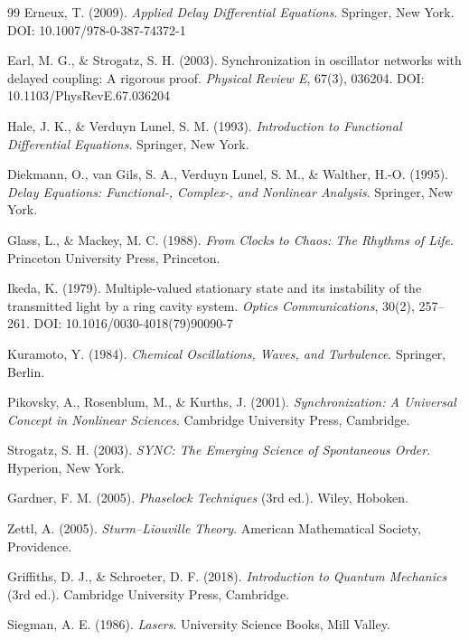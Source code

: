 \documentclass[11pt]{article}
\begin{document}
    
    \begin{thebibliography}{99}
         Erneux, T. (2009). \textit{Applied Delay Differential Equations}. Springer, New York. DOI: 10.1007/978-0-387-74372-1

         Earl, M. G., \& Strogatz, S. H. (2003). Synchronization in oscillator networks with delayed coupling: A rigorous proof. \textit{Physical Review E}, 67(3), 036204. DOI: 10.1103/PhysRevE.67.036204

         Hale, J. K., \& Verduyn Lunel, S. M. (1993). \textit{Introduction to Functional Differential Equations}. Springer, New York.

         Diekmann, O., van Gils, S. A., Verduyn Lunel, S. M., \& Walther, H.-O. (1995). \textit{Delay Equations: Functional-, Complex-, and Nonlinear Analysis}. Springer, New York.

         Glass, L., \& Mackey, M. C. (1988). \textit{From Clocks to Chaos: The Rhythms of Life}. Princeton University Press, Princeton.

         Ikeda, K. (1979). Multiple-valued stationary state and its instability of the transmitted light by a ring cavity system. \textit{Optics Communications}, 30(2), 257--261. DOI: 10.1016/0030-4018(79)90090-7

         Kuramoto, Y. (1984). \textit{Chemical Oscillations, Waves, and Turbulence}. Springer, Berlin.

         Pikovsky, A., Rosenblum, M., \& Kurths, J. (2001). \textit{Synchronization: A Universal Concept in Nonlinear Sciences}. Cambridge University Press, Cambridge.

         Strogatz, S. H. (2003). \textit{SYNC: The Emerging Science of Spontaneous Order}. Hyperion, New York.

         Gardner, F. M. (2005). \textit{Phaselock Techniques} (3rd ed.). Wiley, Hoboken.

         Zettl, A. (2005). \textit{Sturm--Liouville Theory}. American Mathematical Society, Providence.

         Griffiths, D. J., \& Schroeter, D. F. (2018). \textit{Introduction to Quantum Mechanics} (3rd ed.). Cambridge University Press, Cambridge.

         Siegman, A. E. (1986). \textit{Lasers}. University Science Books, Mill Valley.
    \end{thebibliography}
\end{document}
